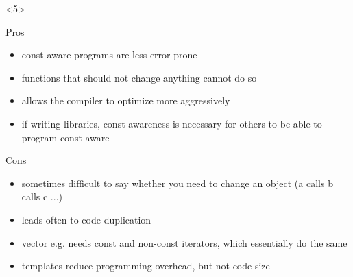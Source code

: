 \documentclass{slides}
\begin{document}
\begin{frame}[fragile]
  \begin{onlyenv}<5>
    \begin{block}{Pros}
      \vspace{-\bigskipamount}
      \begin{itemize}
      \item const-aware programs are less error-prone
      \item functions that should not change anything cannot do so
      \item allows the compiler to optimize more aggressively
      \item if writing libraries, const-awareness is necessary for
        others to be able to program const-aware
      \end{itemize}
    \end{block}

    \begin{block}{Cons}
      \vspace{-\bigskipamount}
      \begin{itemize}
      \item sometimes difficult to say whether you need to change an
        object (a calls b calls c ...)
      \item leads often to code duplication
      \item vector e.g. needs const and non-const iterators, which
        essentially do the same
      \item templates reduce programming overhead, but not
        code size
      \end{itemize}
    \end{block}
  \end{onlyenv}
\end{frame}
\end{document}
